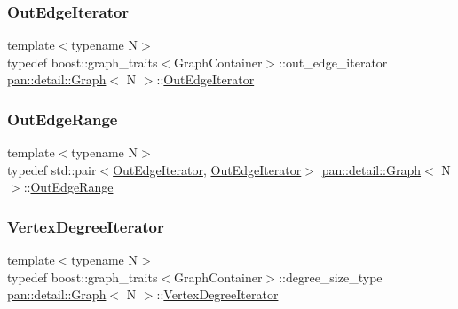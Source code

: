 \mbox{\label{classpan_1_1detail_1_1_graph_ab020b117f26b3d19039491ecb5ff5130}} 
\subsubsection{\texorpdfstring{Out\+Edge\+Iterator}{OutEdgeIterator}}
{\footnotesize\ttfamily template$<$typename N$>$ \\
typedef boost\+::graph\+\_\+traits$<$Graph\+Container$>$\+::out\+\_\+edge\+\_\+iterator \hyperlink{classpan_1_1detail_1_1_graph}{pan\+::detail\+::\+Graph}$<$ N $>$\+::\hyperlink{classpan_1_1detail_1_1_graph_ab020b117f26b3d19039491ecb5ff5130}{Out\+Edge\+Iterator}}

\mbox{\label{classpan_1_1detail_1_1_graph_a6a455005d606a7ead0feba1c84156bc7}} 
\subsubsection{\texorpdfstring{Out\+Edge\+Range}{OutEdgeRange}}
{\footnotesize\ttfamily template$<$typename N$>$ \\
typedef std\+::pair$<$\hyperlink{classpan_1_1detail_1_1_graph_ab020b117f26b3d19039491ecb5ff5130}{Out\+Edge\+Iterator}, \hyperlink{classpan_1_1detail_1_1_graph_ab020b117f26b3d19039491ecb5ff5130}{Out\+Edge\+Iterator}$>$ \hyperlink{classpan_1_1detail_1_1_graph}{pan\+::detail\+::\+Graph}$<$ N $>$\+::\hyperlink{classpan_1_1detail_1_1_graph_a6a455005d606a7ead0feba1c84156bc7}{Out\+Edge\+Range}}

\mbox{\label{classpan_1_1detail_1_1_graph_a4f48579e58569a6607cdc95f80a001ea}} 
\subsubsection{\texorpdfstring{Vertex\+Degree\+Iterator}{VertexDegreeIterator}}
{\footnotesize\ttfamily template$<$typename N$>$ \\
typedef boost\+::graph\+\_\+traits$<$Graph\+Container$>$\+::degree\+\_\+size\+\_\+type \hyperlink{classpan_1_1detail_1_1_graph}{pan\+::detail\+::\+Graph}$<$ N $>$\+::\hyperlink{classpan_1_1detail_1_1_graph_a4f48579e58569a6607cdc95f80a001ea}{Vertex\+Degree\+Iterator}}

